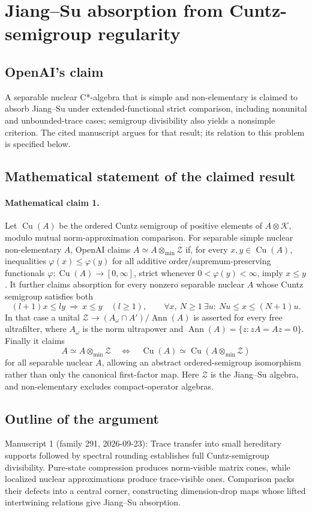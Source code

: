 \documentclass[11pt]{article}
\begin{document}
\section*{Jiang–Su absorption from Cuntz-semigroup regularity}

\subsection{OpenAI's claim}
A separable nuclear C*-algebra that is simple and non-elementary is claimed to absorb Jiang--Su under extended-functional strict comparison, including nonunital and unbounded-trace cases; semigroup divisibility also yields a nonsimple criterion. The cited manuscript argues for that result; its relation to this problem is specified below.

\subsection{Mathematical statement of the claimed result}
\paragraph{Mathematical claim 1.} Let $\operatorname{Cu}(A)$ be the ordered Cuntz semigroup of positive elements of $A\otimes\mathcal K$, modulo mutual norm-approximation comparison. For separable simple nuclear non-elementary $A$, OpenAI claims $A\simeq A\otimes_{\min}\mathcal Z$ if, for every $x,y\in\operatorname{Cu}(A)$, inequalities $\varphi(x)\le\varphi(y)$ for all additive order/supremum-preserving functionals $\varphi:\operatorname{Cu}(A)\to[0,\infty]$, strict whenever $0<\varphi(y)<\infty$, imply $x\le y$.
It further claims absorption for every nonzero separable nuclear $A$ whose Cuntz semigroup satisfies both
\[
(l+1)x\le ly\ \Longrightarrow\ x\le y\quad(l\ge1),\qquad
\forall x,\ N\ge1\ \exists u:\ Nu\le x\le(N+1)u.
\]
In that case a unital $\mathcal Z\to (A_\omega\cap A')/\operatorname{Ann}(A)$ is asserted for every free ultrafilter, where $A_\omega$ is the norm ultrapower and $\operatorname{Ann}(A)=\{z:zA=Az=0\}$. Finally it claims
\[
A\simeq A\otimes_{\min}\mathcal Z\quad\Longleftrightarrow\quad
\operatorname{Cu}(A)\simeq\operatorname{Cu}(A\otimes_{\min}\mathcal Z)
\]
for all separable nuclear $A$, allowing an abstract ordered-semigroup isomorphism rather than only the canonical first-factor map. Here $\mathcal Z$ is the Jiang--Su algebra, and non-elementary excludes compact-operator algebras.

\subsection{Outline of the argument}
Manuscript 1 (family 291, 2026-09-23): Trace transfer into small hereditary supports followed by spectral rounding establishes full Cuntz-semigroup divisibility. Pure-state compression produces norm-visible matrix cones, while localized nuclear approximations produce trace-visible ones. Comparison packs their defects into a central corner, constructing dimension-drop maps whose lifted intertwining relations give Jiang--Su absorption.
\end{document}
